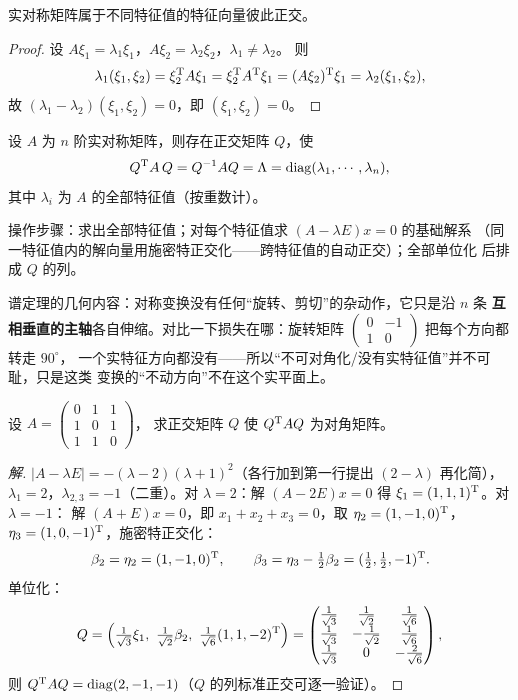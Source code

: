 \begin{theorem}\label{thm:symmetric-orthogonal}
实对称矩阵属于不同特征值的特征向量彼此正交。
\end{theorem}
\begin{proof}
设 $A\xi_1=\lambda_1\xi_1$，$A\xi_2=\lambda_2\xi_2$，$\lambda_1\neq\lambda_2$。
则
\[
  \lambda_1(\xi_1,\xi_2)=\xi_2^{\mathrm{T}} A\xi_1
  =\xi_2^{\mathrm{T}} A^{\mathrm{T}}\xi_1=(A\xi_2)^{\mathrm{T}}\xi_1=\lambda_2(\xi_1,\xi_2),
\]
故 $(\lambda_1-\lambda_2)(\xi_1,\xi_2)=0$，即 $(\xi_1,\xi_2)=0$。
\end{proof}

\begin{theorem}\label{thm:spectral}
设 $A$ 为 $n$ 阶实对称矩阵，则存在正交矩阵 $Q$，使
\[
  Q^{\mathrm{T}} A\,Q=Q^{-1}AQ=\Lambda=\operatorname{diag}(\lambda_1,\cdots,\lambda_n),
\]
其中 $\lambda_i$ 为 $A$ 的全部特征值（按重数计）。
\end{theorem}

操作步骤：求出全部特征值；对每个特征值求 $(A-\lambda E)x=0$ 的基础解系
（同一特征值内的解向量用施密特正交化——跨特征值的自动正交）；全部单位化
后排成 $Q$ 的列。

\begin{insight}[本质：实对称 = 沿互相垂直的主轴纯拉伸]
谱定理的几何内容：对称变换没有任何“旋转、剪切”的杂动作，它只是沿 $n$ 条
\textbf{互相垂直的主轴}各自伸缩。对比一下损失在哪：旋转矩阵
$\begin{pmatrix} 0 & -1 \\ 1 & 0 \end{pmatrix}$ 把每个方向都转走 $90^\circ$，
一个实特征方向都没有——所以“不可对角化/没有实特征值”并不可耻，只是这类
变换的“不动方向”不在这个实平面上。
\end{insight}

\begin{example}\label{ex:spectral}
设 $A=\begin{pmatrix} 0 & 1 & 1 \\ 1 & 0 & 1 \\ 1 & 1 & 0 \end{pmatrix}$，
求正交矩阵 $Q$ 使 $Q^{\mathrm{T}} AQ$ 为对角矩阵。
\end{example}
\begin{proof}[解]
$|A-\lambda E|=-(\lambda-2)(\lambda+1)^2$（各行加到第一行提出
$(2-\lambda)$ 再化简），$\lambda_1=2$，$\lambda_{2,3}=-1$（二重）。对
$\lambda=2$：解 $(A-2E)x=0$ 得 $\xi_1=(1,1,1)^{\mathrm{T}}$。对 $\lambda=-1$：
解 $(A+E)x=0$，即 $x_1+x_2+x_3=0$，取 $\eta_2=(1,-1,0)^{\mathrm{T}}$，
$\eta_3=(1,0,-1)^{\mathrm{T}}$，施密特正交化：
\[
  \beta_2=\eta_2=(1,-1,0)^{\mathrm{T}},\qquad
  \beta_3=\eta_3-\tfrac12\beta_2=(\tfrac12,\tfrac12,-1)^{\mathrm{T}} .
\]
单位化：
\[
  Q=\left(
  \tfrac{1}{\sqrt3}\xi_1,\ \tfrac{1}{\sqrt2}\beta_2,\ \tfrac{1}{\sqrt6}(1,1,-2)\trans
  \right)
  =\begin{pmatrix}
    \tfrac{1}{\sqrt3} & \tfrac{1}{\sqrt2} & \tfrac{1}{\sqrt6} \\
    \tfrac{1}{\sqrt3} & -\tfrac{1}{\sqrt2} & \tfrac{1}{\sqrt6} \\
    \tfrac{1}{\sqrt3} & 0 & -\tfrac{2}{\sqrt6}
  \end{pmatrix},
\]
则 $Q^{\mathrm{T}} AQ=\operatorname{diag}(2,-1,-1)$（$Q$ 的列标准正交可逐一验证）。
\end{proof}


